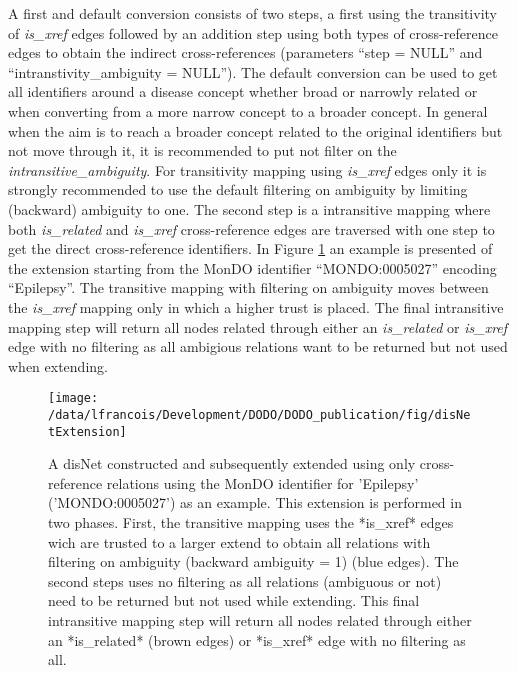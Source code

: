 \documentclass[9pt,a4paper,]{extarticle}
\begin{document}
A first and default conversion consists of two steps, a first using the transitivity of \emph{is\_xref} edges followed by an addition step using both types of cross-reference edges to obtain the indirect cross-references (parameters ``step = NULL'' and ``intranstivity\_ambiguity = NULL''). The default conversion can be used to get all identifiers around a disease concept whether broad or narrowly related or when converting from a more narrow concept to a broader concept. In general when the aim is to reach a broader concept related to the original identifiers but not move through it, it is recommended to put not filter on the \emph{intransitive\_ambiguity}. For transitivity mapping using \emph{is\_xref} edges only it is strongly recommended to use the default filtering on ambiguity by limiting (backward) ambiguity to one. The second step is a intransitive mapping where both \emph{is\_related} and \emph{is\_xref} cross-reference edges are traversed with one step to get the direct cross-reference identifiers. In Figure \ref{fig:extension} an example is presented of the extension starting from the MonDO identifier ``MONDO:0005027'' encoding ``Epilepsy''. The transitive mapping with filtering on ambiguity moves between the \emph{is\_xref} mapping only in which a higher trust is placed. The final intransitive mapping step will return all nodes related through either an \emph{is\_related} or \emph{is\_xref} edge with no filtering as all ambigious relations want to be returned but not used when extending.

\begin{figure}

{\centering \texttt{[image: /data/lfrancois/Development/DODO/DODO\_publication/fig/disNetExtension]} 

}

\caption{A disNet constructed and subsequently extended using only cross-reference relations using the MonDO identifier for 'Epilepsy' ('MONDO:0005027') as an example. This extension is performed in two phases. First, the transitive mapping uses the *is\_xref* edges wich are trusted to a larger extend to obtain all relations with filtering on ambiguity (backward ambiguity = 1) (blue edges). The second steps uses no filtering as all relations (ambiguous or not) need to be returned but not used while extending. This final intransitive mapping step will return all nodes related through either an *is\_related* (brown edges) or *is\_xref* edge with no filtering as all.}\label{fig:extension}
\end{figure}
\end{document}
